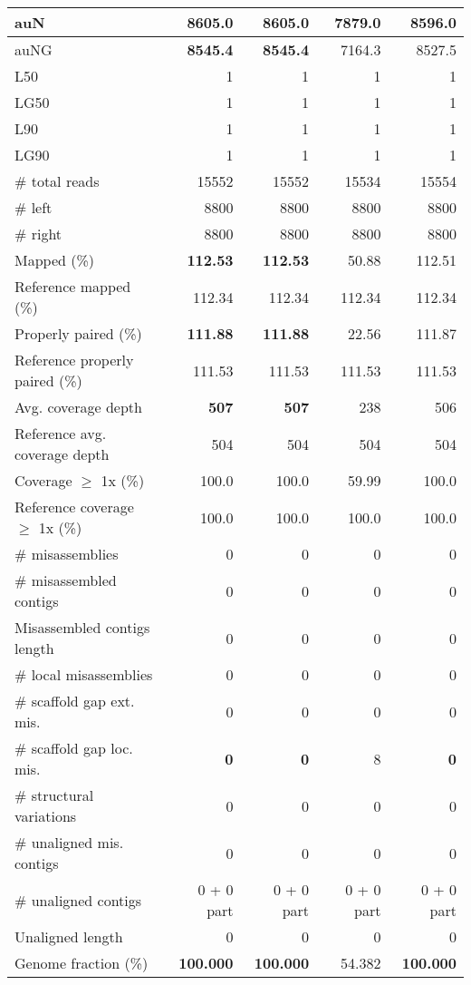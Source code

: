 \documentclass[12pt,a4paper]{article}
\begin{document}
\begin{table}[ht]
\begin{center}
\begin{tabular}{|l*{4}{|r}|}
auN & {\bf 8605.0} & {\bf 8605.0} & 7879.0 & 8596.0 \\ \hline
auNG & {\bf 8545.4} & {\bf 8545.4} & 7164.3 & 8527.5 \\ \hline
L50 & 1 & 1 & 1 & 1 \\ \hline
LG50 & 1 & 1 & 1 & 1 \\ \hline
L90 & 1 & 1 & 1 & 1 \\ \hline
LG90 & 1 & 1 & 1 & 1 \\ \hline
\# total reads & 15552 & 15552 & 15534 & 15554 \\ \hline
\# left & 8800 & 8800 & 8800 & 8800 \\ \hline
\# right & 8800 & 8800 & 8800 & 8800 \\ \hline
Mapped (\%) & {\bf 112.53} & {\bf 112.53} & 50.88 & 112.51 \\ \hline
Reference mapped (\%) & 112.34 & 112.34 & 112.34 & 112.34 \\ \hline
Properly paired (\%) & {\bf 111.88} & {\bf 111.88} & 22.56 & 111.87 \\ \hline
Reference properly paired (\%) & 111.53 & 111.53 & 111.53 & 111.53 \\ \hline
Avg. coverage depth & {\bf 507} & {\bf 507} & 238 & 506 \\ \hline
Reference avg. coverage depth & 504 & 504 & 504 & 504 \\ \hline
Coverage $\geq$ 1x (\%) & 100.0 & 100.0 & 59.99 & 100.0 \\ \hline
Reference coverage $\geq$ 1x (\%) & 100.0 & 100.0 & 100.0 & 100.0 \\ \hline
\# misassemblies & 0 & 0 & 0 & 0 \\ \hline
\# misassembled contigs & 0 & 0 & 0 & 0 \\ \hline
Misassembled contigs length & 0 & 0 & 0 & 0 \\ \hline
\# local misassemblies & 0 & 0 & 0 & 0 \\ \hline
\# scaffold gap ext. mis. & 0 & 0 & 0 & 0 \\ \hline
\# scaffold gap loc. mis. & {\bf 0} & {\bf 0} & 8 & {\bf 0} \\ \hline
\# structural variations & 0 & 0 & 0 & 0 \\ \hline
\# unaligned mis. contigs & 0 & 0 & 0 & 0 \\ \hline
\# unaligned contigs & 0 + 0 part & 0 + 0 part & 0 + 0 part & 0 + 0 part \\ \hline
Unaligned length & 0 & 0 & 0 & 0 \\ \hline
Genome fraction (\%) & {\bf 100.000} & {\bf 100.000} & 54.382 & {\bf 100.000} \\ \hline

\end{tabular}
\end{center}
\end{table}
\end{document}
